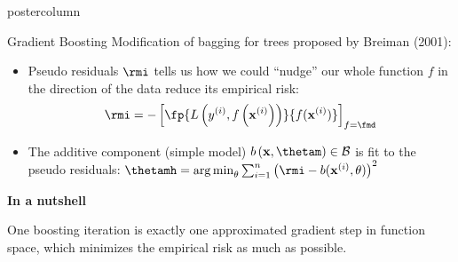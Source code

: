 \documentclass{beamer}
\newlength{\columnheight} %
\begin{document}
\begin{frame}[fragile]{}
\begin{columns}
\begin{column}{.31\textwidth}
  \begin{beamercolorbox}[center]{postercolumn}
    \begin{minipage}{.98\textwidth}
      \parbox[t][\columnheight]{\textwidth}{
        \begin{myblock}{Gradient Boosting}
          Modification of bagging for trees proposed by Breiman (2001):
          \begin{itemize}[$\bullet$]
            \setlength{\itemindent}{+.3in}
            \item
              Pseudo residuals $\rmi$ tells us how we could \enquote{nudge} our whole
              function $f$ in the direction of the data reduce its empirical risk:
              $$
              \rmi = -\left[\fp{\Lxyi}{f(\xi)}\right]_{f=\fmd}
              $$
            \item
              The additive component (simple model) $b\left(\xv, \thetam\right) \in \mathcal{B}$ is
              fit to the pseudo residuals: $\thetamh = \argmin_{\theta} \sum_{i=1}^n \left(\rmi - b(\xi, \theta)\right)^2$
          \end{itemize}
          

          \begin{codebox}
            \textbf{In a nutshell}
          \end{codebox}
            One boosting iteration is exactly one approximated gradient step in
            function space, which minimizes the empirical risk as much as possible.


\end{myblock}}
\end{minipage}
\end{beamercolorbox}
\end{column}
\end{columns}
\end{frame}
\end{document}
